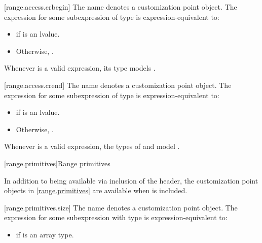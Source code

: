 \begin{addedblock}
[range.access.crbegin]{}
\pnum
The name  denotes a customization point
object. The expression
 for some subexpression  of type
 is expression-equivalent to:
\begin{itemize}
\item {} if  is
  an lvalue.
\item Otherwise, .
\end{itemize}

\pnum
\begin{note}
Whenever  is a valid expression, its
type models .
\end{note}

[range.access.crend]{}
\pnum
The name  denotes a customization point
object. The expression
 for some subexpression  of type 
is expression-equivalent to:
\begin{itemize}
\item {} if  is an lvalue.

\item Otherwise, .
\end{itemize}

\pnum
\begin{note}
Whenever  is a valid expression, the
types  of  and 
model .
\end{note}

[range.primitives]{Range primitives}

\pnum
In addition to being available via inclusion of the  header,
the customization point objects in \ref{range.primitives} are available
when  is included.

[range.primitives.size]{}
\pnum
The name  denotes a customization point
object. The expression
 for some subexpression  with type
 is expression-equivalent to:

\begin{itemize}
\item
   if  is an array
  type.


\end{itemize}
\end{addedblock}
